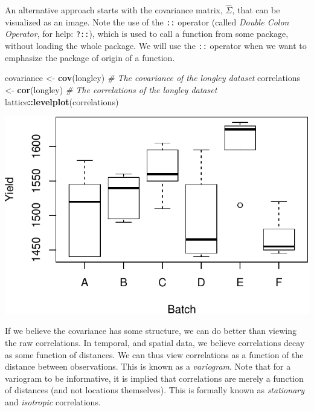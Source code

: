 \documentclass[]{book}
\newenvironment{Shaded}{\begin{snugshade}}{\end{snugshade}}
\newcommand{\CommentTok}[1]{\textcolor[rgb]{0.56,0.35,0.01}{\textit{#1}}}
\newcommand{\KeywordTok}[1]{\textcolor[rgb]{0.13,0.29,0.53}{\textbf{#1}}}
\newcommand{\NormalTok}[1]{#1}
\newcommand{\OperatorTok}[1]{\textcolor[rgb]{0.81,0.36,0.00}{\textbf{#1}}}
\newcommand{\StringTok}[1]{\textcolor[rgb]{0.31,0.60,0.02}{#1}}
\theoremstyle{definition}
\theoremstyle{definition}
\theoremstyle{definition}
\theoremstyle{remark}
\begin{document}
An alternative approach starts with the covariance matrix, \(\hat \Sigma\), that can be visualized as an image.
Note the use of the \texttt{::} operator (called \emph{Double Colon Operator}, for help: \texttt{?\textquotesingle{}::\textquotesingle{}}), which is used to call a function from some package, without loading the whole package.
We will use the \texttt{::} operator when we want to emphasize the package of origin of a function.

\begin{Shaded}
\begin{Highlighting}[]
\NormalTok{covariance <-}\StringTok{ }\KeywordTok{cov}\NormalTok{(longley) }\CommentTok{# The covariance of the longley dataset}
\NormalTok{correlations <-}\StringTok{ }\KeywordTok{cor}\NormalTok{(longley) }\CommentTok{# The correlations of the longley dataset}
\NormalTok{lattice}\OperatorTok{::}\KeywordTok{levelplot}\NormalTok{(correlations)}
\end{Highlighting}
\end{Shaded}

\includegraphics[width=0.5\linewidth]{Rcourse_files/figure-latex/unnamed-chunk-142-1}

If we believe the covariance has some structure, we can do better than viewing the raw correlations.
In temporal, and spatial data, we believe correlations decay as some function of distances.
We can thus view correlations as a function of the distance between observations. This is known as a \emph{variogram}.
Note that for a variogram to be informative, it is implied that correlations are merely a function of distances (and not locations themselves).
This is formally known as \emph{stationary} and \emph{isotropic} correlations.
\end{document}
